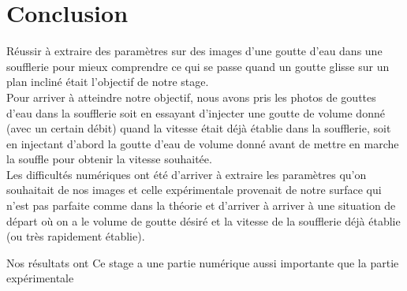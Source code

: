 
\section{Conclusion}

Réussir à extraire des paramètres sur des images d'une goutte d'eau dans une soufflerie pour mieux comprendre ce qui se passe quand un goutte glisse sur un plan incliné était l'objectif de notre stage.\\


Pour arriver à atteindre notre objectif, nous avons pris les photos de gouttes d'eau dans la soufflerie soit en essayant d'injecter une goutte de volume donné (avec un certain débit) quand la vitesse était déjà établie dans la soufflerie, soit en injectant d'abord la goutte d'eau de volume donné avant de mettre en marche la souffle pour obtenir la vitesse souhaitée.\\

Les difficultés numériques ont été d'arriver à extraire les paramètres qu'on souhaitait de nos images et celle expérimentale provenait de notre surface qui n'est pas parfaite comme dans la théorie et d'arriver à arriver à une situation de départ où on a le volume de goutte désiré et la vitesse de la soufflerie déjà établie (ou très rapidement établie).

Nos résultats ont
Ce stage a une partie numérique aussi importante que la partie expérimentale

